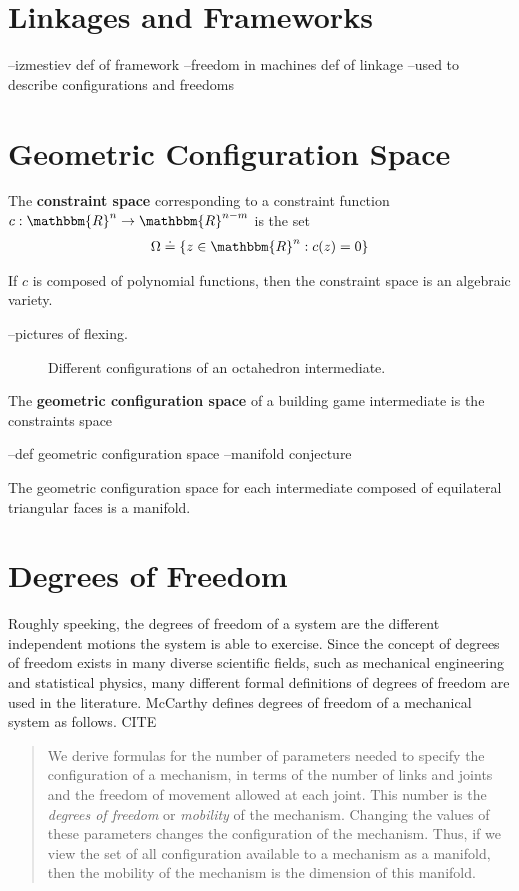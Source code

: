 \section{Linkages and Frameworks}
--izmestiev def of framework
--freedom in machines def of linkage
--used to describe configurations and freedoms 
\section{Geometric Configuration Space}
\begin{mydef}
The \textbf{constraint space} corresponding to a constraint function $c: \mathbbm{R}^n \to \mathbbm{R}^{n-m}$ is the set
\begin{align}
\Omega \doteq \{z \in \mathbbm{R}^n : c(z) = 0\}
\end{align}
\end{mydef}
If $c$ is composed of polynomial functions, then the constraint space is an algebraic variety. 


 --pictures of flexing. 
\begin{figure}[ht]
\caption{Different configurations of an octahedron intermediate.}
\label{fig:OctaGCS}
\end{figure}


\begin{mydef}
The \textbf{geometric configuration space} of a building game intermediate is the constraints space 
\end{mydef}
--def geometric configuration space
--manifold conjecture

\begin{mycon}
The geometric configuration space for each intermediate composed of equilateral triangular faces is a manifold.
\end{mycon}

%

\section{Degrees of Freedom}
Roughly speeking, the degrees of freedom of a system are the different independent motions the system is able to exercise. Since the concept of degrees of freedom exists in many diverse scientific fields, such as mechanical engineering and statistical physics, many different formal definitions of degrees of freedom are used in the literature. McCarthy defines degrees of freedom of a mechanical system as follows. CITE 
\begin{quote}
We derive formulas for the number of parameters needed to specify the configuration of a mechanism, in terms of the number of links and joints and the freedom of movement allowed at each joint. This number is the \textit{degrees of freedom} or \textit{mobility} of the mechanism. Changing the values of these parameters changes the configuration of the mechanism. Thus, if we view the set of all configuration available to a mechanism as a manifold, then the mobility of the mechanism is the dimension of this manifold. 
\end{quote}

